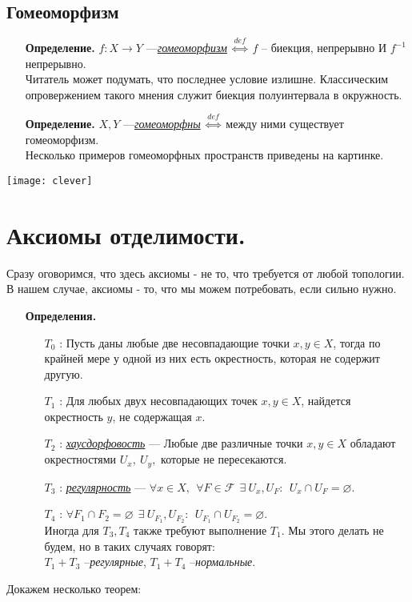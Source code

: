 \documentclass[10pt]{report}
\begin{document}
\begin{spacing}{1.5}
\subsection{Гомеоморфизм}
\begin{enumerate}
\item[\textbf{Определение.}]
$f:X\rightarrow Y$ ---\underline{\textit{гомеоморфизм}} $\overset{def}{\Longleftrightarrow}$ $f$ -- биекция, непрерывно И $f^{-1}$ непрерывно.\\
Читатель может подумать, что последнее условие излишне. Классическим опровержением такого мнения служит биекция полуинтервала в окружность.
\item[\textbf{Определение.}] $X, Y$ ---\underline{\textit{гомеоморфны}} $\overset{def}{\Longleftrightarrow}$ между ними существует гомеоморфизм.\\
Несколько примеров гомеоморфных пространств приведены на картинке.
\end{enumerate}




\texttt{[image: clever]}

\section{Аксиомы отделимости.}
Сразу оговоримся, что здесь аксиомы - не то, что требуется от любой топологии. В нашем случае, аксиомы - то, что мы можем потребовать, если сильно нужно.
\begin{enumerate}
\item[\textbf{Определения.}]
\begin{enumerate}
\item[\underline{$T_{0}$}]: Пусть даны любые две несовпадающие точки $x, y \in X$, тогда по крайней мере у одной из них есть окрестность, которая не содержит другую.
\item[\underline{$T_{1}$}]: Для любых двух несовпадающих точек $x, y \in X$, найдется окрестность $y$, не содержащая $x$.
\item[\underline{$T_{2}$}]: \underline{\emph{хаусдорфовость}} ---  Любые две различные точки $x, y \in X$ обладают окрестностями $U_{x},~U_{y},$ которые не пересекаются.
\item[\underline{$T_{3}$}]: \underline{\textit{регулярность}} --- $\forall x\in X,~~\forall F\in\mathcal{F}~~\exists~U_{x}, U_{F}:~~U_{x}\cap U_{F} = \varnothing.$
\item[\underline{$T_{4}$}]: $\forall F_{1}\cap F_{2}=\varnothing~~\exists~U_{F_{1}}, U_{F_{2}}:~~U_{F_{1}}\cap U_{F_{2}} = \varnothing.$\\
Иногда для $T_{3}, T_{4}$ также требуют выполнение $T_{1}$. Мы этого делать не будем, но в таких случаях говорят: \\
$T_{1}+T_{3}$ --\emph{регулярные}, $T_{1}+T_{4}$ --\emph{нормальные}.
\end{enumerate}
\end{enumerate}
Докажем несколько теорем:

\end{spacing}
\end{document}
